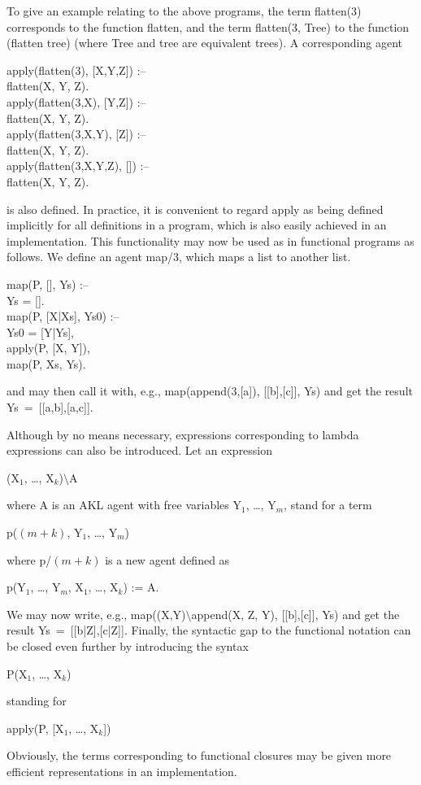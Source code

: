 To give an example relating to the above programs, the term {\prog
flatten(3) corresponds} to the function {\prog flatten,} and the term
{\prog flatten(3, Tree)} to the function {\prog (flatten tree)} (where
{\prog Tree} and {\prog tree} are equivalent trees).  A corresponding
agent
%
\begin{program}
apply(flatten(3), [X,Y,Z]) :-- \\
\>\cond\>	flatten(X, Y, Z).  \\
apply(flatten(3,X), [Y,Z]) :-- \\
\>\cond\>	flatten(X, Y, Z).  \\
apply(flatten(3,X,Y), [Z]) :-- \\
\>\cond\>	flatten(X, Y, Z).  \\
apply(flatten(3,X,Y,Z), []) :-- \\
\>\cond\>	flatten(X, Y, Z).
\end{program}%
%
is also defined.  In practice, it is convenient to regard apply as
being defined implicitly for all definitions in a program, which is
also easily achieved in an implementation.  This functionality may now
be used as in functional programs as follows.  We define an agent
{\prog map/3}, which maps a list to another list.
%
\begin{program}
map(P, [], Ys) :-- \\
\>\cond\>	Ys = [].  \\
map(P, [X|Xs], Ys0) :-- \\
\>\cond\>	Ys0 = [Y|Ys], \\
\>\>	apply(P, [X, Y]), \\
\>\>	map(P, Xs, Ys).
\end{program}%
%
and may then call it with, e.g., {\prog map(append(3,[a]), [[b],[c]],
Ys)} and get the result {\prog Ys~=~[[a,b],[a,c]]}.

Although by no means necessary, expressions corresponding to lambda 
expressions can also be introduced.  Let an expression
%
\begin{progex}
(X$_1$, \dots, X$_k$)$\setminus$A
\end{progex}%
%
where {\prog A} is an AKL agent with free variables {\prog Y$_1$}, \dots,
{\prog Y$_m$}, stand for a term
%
\begin{progex}
p($(m+k)$, Y$_1$, \dots, Y$_m$)
\end{progex}%
%
where {\prog p/$(m+k)$} is a new agent defined as
%
\begin{progex}
p(Y$_1$, \dots, Y$_m$, X$_1$, \dots, X$_k$) := A.
\end{progex}%
%
We may now write, e.g., {\prog map((X,Y)$\setminus$append(X, Z, Y),
[[b],[c]], Ys)} and get the result {\prog Ys~=~[[b|Z],[c|Z]]}.
Finally, the syntactic gap to the functional notation can be closed
even further by introducing the syntax
%
\begin{progex}
P(X$_1$, \dots, X$_k$)
\end{progex}%
%
standing for
%
\begin{progex}
apply(P, [X$_1$, \dots, X$_k$])
\end{progex}%
%
Obviously, the terms corresponding to functional closures may be given
more efficient representations in an implementation.

